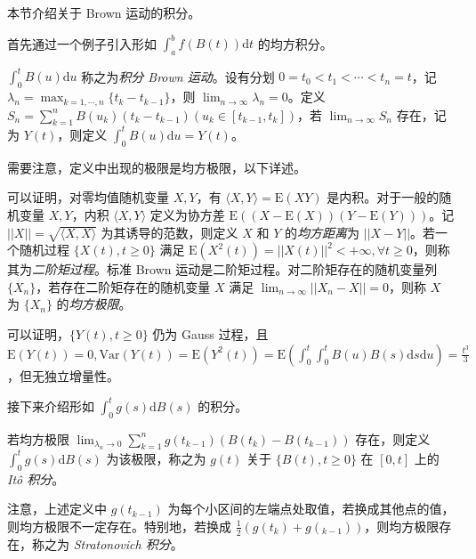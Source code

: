 \documentclass[../main.tex]{subfiles}
\begin{document}
本节介绍关于 Brown 运动的积分。

首先通过一个例子引入形如 $\int_a^bf(B(t))\mathrm dt$ 的均方积分。

\begin{example}
    $\int_0^tB(u)\mathrm du$ 称之为\emph{积分 Brown 运动}。设有分划 $0=t_0<t_1<\cdots<t_n=t$，记 $\lambda_n=\max_{k=1,\cdots,n}\{t_k-t_{k-1}\}$，则 $\lim_{n\rightarrow\infty}\lambda_n=0$。定义 $S_n=\sum_{k=1}^nB(u_k)(t_k-t_{k-1})(u_k\in[t_{k-1},t_k])$，若 $\lim_{n\rightarrow\infty}S_n$ 存在，记为 $Y(t)$，则定义 $\int_0^tB(u)\mathrm du=Y(t)$。
\end{example}

需要注意，定义中出现的极限是均方极限，以下详述。

\begin{definition}\label{def:8.5.1}
    可以证明，对零均值随机变量 $X,Y$，有 $\langle X,Y\rangle=\mathrm E(XY)$ 是内积。对于一般的随机变量 $X,Y$，内积 $\langle X,Y\rangle$ 定义为协方差 $\mathrm E((X-\mathrm E(X))(Y-\mathrm E(Y)))$。记 $||X||=\sqrt{\langle X,X\rangle}$ 为其诱导的范数，则定义 $X$ 和 $Y$ 的\emph{均方距离}为 $||X-Y||$。若一个随机过程 $\{X(t),t\geq0\}$ 满足 $\mathrm E(X^2(t))=||X(t)||^2<+\infty,\forall t\geq0$，则称其为\emph{二阶矩过程}。标准 Brown 运动是二阶矩过程。对二阶矩存在的随机变量列 $\{X_n\}$，若存在二阶矩存在的随机变量 $X$ 满足 $\lim_{n\rightarrow\infty}||X_n-X||=0$，则称 $X$ 为 $\{X_n\}$ 的\emph{均方极限}。
\end{definition}

可以证明，$\{Y(t),t\geq0\}$ 仍为 Gauss 过程，且 $\mathrm E(Y(t))=0,\mathrm{Var}(Y(t))=\mathrm E(Y^2(t))=\mathrm E(\int_0^t\int_0^tB(u)B(s)\mathrm ds\mathrm du)=\frac{t^3}3$，但无独立增量性。

接下来介绍形如 $\int_0^tg(s)\mathrm dB(s)$ 的积分。

\begin{definition}\label{def:8.5.2}
    若均方极限 $\lim_{\lambda_n\rightarrow0}\sum_{k=1}^ng(t_{k-1})(B(t_k)-B(t_{k-1}))$ 存在，则定义 $\int_0^tg(s)\mathrm dB(s)$ 为该极限，称之为 $g(t)$ 关于 $\{B(t),t\geq0\}$ 在 $[0,t]$ 上的 \emph{It\^o 积分}。
\end{definition}

注意，上述定义中 $g(t_{k-1})$ 为每个小区间的左端点处取值，若换成其他点的值，则均方极限不一定存在。特别地，若换成 $\frac12(g(t_k)+g(_{k-1}))$，则均方极限存在，称之为 \emph{Stratonovich 积分}。
\end{document}
